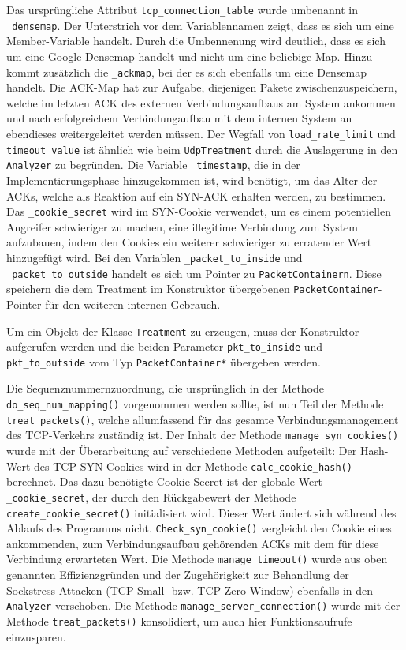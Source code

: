 \documentclass[../review_2.tex]{subfiles}
\begin{document}
Das ursprüngliche Attribut \texttt{tcp\_connection\_table} wurde umbenannt in \texttt{\_densemap}. Der Unterstrich vor dem Variablennamen zeigt, dass es sich um eine Member-Variable handelt. Durch die Umbennenung wird  deutlich, dass es sich um eine Google-Densemap handelt und nicht um eine beliebige Map. 
Hinzu kommt zusätzlich die \texttt{\_ackmap}, bei der es sich ebenfalls um eine Densemap handelt. Die ACK-Map hat zur Aufgabe, diejenigen Pakete zwischenzuspeichern, welche im letzten ACK des externen Verbindungsaufbaus am System ankommen und nach erfolgreichem Verbindungaufbau mit dem internen System an ebendieses weitergeleitet werden müssen.
Der Wegfall von \texttt{load\_rate\_limit} und \texttt{timeout\_value} ist ähnlich wie beim \texttt{UdpTreatment} durch die Auslagerung in den \texttt{Analyzer} zu begründen.
Die Variable \texttt{\_timestamp}, die in der Implementierungsphase hinzugekommen ist, wird benötigt, um das Alter der ACKs, welche als Reaktion auf ein SYN-ACK erhalten werden, zu bestimmen.
Das \texttt{\_cookie\_secret} wird im SYN-Cookie verwendet, um es einem potentiellen Angreifer schwieriger zu machen, eine illegitime Verbindung zum System aufzubauen, indem den Cookies ein weiterer schwieriger zu erratender Wert hinzugefügt wird.
Bei den Variablen \texttt{\_packet\_to\_inside} und \texttt{\_packet\_to\_outside} handelt es sich um Pointer zu \texttt{PacketContainern}. Diese speichern die dem Treatment im Konstruktor übergebenen \texttt{PacketContainer}-Pointer für den weiteren internen Gebrauch.

Um ein Objekt der Klasse \texttt{Treatment} zu erzeugen, muss der Konstruktor aufgerufen werden und die beiden Parameter \texttt{pkt\_to\_inside} und \texttt{pkt\_to\_outside} vom Typ \texttt{PacketContainer*} übergeben werden.

Die Sequenznummernzuordnung, die ursprünglich in der Methode \texttt{do\_seq\_num\_mapping()} vorgenommen werden sollte, ist nun Teil der Methode \texttt{treat\_packets()}, welche allumfassend für das gesamte Verbindungsmanagement des TCP-Verkehrs zuständig ist.
Der Inhalt der Methode \texttt{manage\_syn\_cookies()} wurde mit der Überarbeitung auf verschiedene Methoden aufgeteilt: Der Hash-Wert des TCP-SYN-Cookies wird in der Methode \texttt{calc\_cookie\_hash()} berechnet. Das dazu benötigte Cookie-Secret ist der globale Wert \texttt{\_cookie\_secret}, der durch den Rückgabewert der Methode \texttt{create\_cookie\_secret()} initialisiert wird. Dieser Wert ändert sich während des Ablaufs des Programms nicht. \texttt{Check\_syn\_cookie()} vergleicht den Cookie eines ankommenden, zum Verbindungsaufbau gehörenden ACKs mit dem für diese Verbindung erwarteten Wert.
Die Methode \texttt{manage\_timeout()} wurde aus oben genannten Effizienzgründen und der Zugehörigkeit zur Behandlung der Sockstress-Attacken (TCP-Small- bzw. TCP-Zero-Window) ebenfalls in den \texttt{Analyzer} verschoben. 
Die Methode \texttt{manage\_server\_connection()} wurde mit der Methode \texttt{treat\_packets()} konsolidiert, um auch hier Funktionsaufrufe einzusparen.
\end{document}
